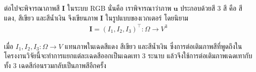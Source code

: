 \hspace{1cm} ต่อไปจะพิจารณาภาพสี $\boldsymbol{I}$ ในระบบ RGB นั่นคือ เราพิจารณาว่าภาพ $\boldsymbol{u}$ ประกอบด้วยสี 3 สี คือ สีแดง, สีเขียว และสีน้ำเงิน จึงเขียนภาพ $\boldsymbol{I}$  ในรูปแบบของเวกเตอร์ โดยนิยาม
\begin{align*}
	\boldsymbol{I} = (I_1,I_2,I_3)^{\top} : \Omega  \rightarrow V^3	
\end{align*}

\noindent เมื่อ $I_1,I_2,I_3: \Omega  \rightarrow V$ แทนภาพในเฉดสีแดง สีเขียว และสีน้ำเงิน ซึ่งการต่อเติมภาพสีที่พูดถึงในโครงงานวิจัยนี้จะทำการแยกแต่ละเฉดสีออกเป็นเฉดเทา 3 ระนาบ แล้วจึงใช้การต่อเติมภาพเฉดเทากับทั้ง 3 เฉดสีก่อนรวมกลับเป็นภาพสีอีกครั้ง


